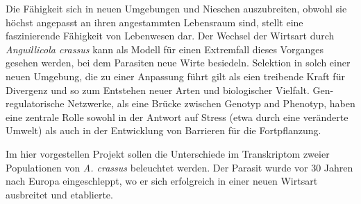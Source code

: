 

\begin{zusammenfassung}        %


  Die Fähigkeit sich in neuen Umgebungen und Nieschen auszubreiten,
  obwohl sie höchst angepasst an ihren angestammten Lebensraum sind,
  stellt eine faszinierende Fähigkeit von Lebenwesen dar. Der Wechsel
  der Wirtsart durch \textit{Anguillicola crassus} kann als Modell für
  einen Extremfall dieses Vorganges gesehen werden, bei dem Parasiten
  neue Wirte besiedeln. Selektion in solch einer neuen Umgebung, die
  zu einer Anpassung führt gilt als eien treibende Kraft für Divergenz
  und so zum Entstehen neuer Arten und biologischer Vielfalt.
  Gen-regulatorische Netzwerke, als eine Brücke zwischen Genotyp and
  Phenotyp, haben eine zentrale Rolle sowohl in der Antwort auf Stress
  (etwa durch eine veränderte Umwelt) als auch in der Entwicklung von
  Barrieren für die Fortpflanzung.

  Im hier vorgestellen Projekt sollen die Unterschiede im Transkriptom
  zweier Populationen von \textit{A. crassus} beleuchtet werden. Der
  Parasit wurde vor 30 Jahren nach Europa eingeschleppt, wo er sich
  erfolgreich in einer neuen Wirtsart ausbreitet und etablierte.



\end{zusammenfassung}





